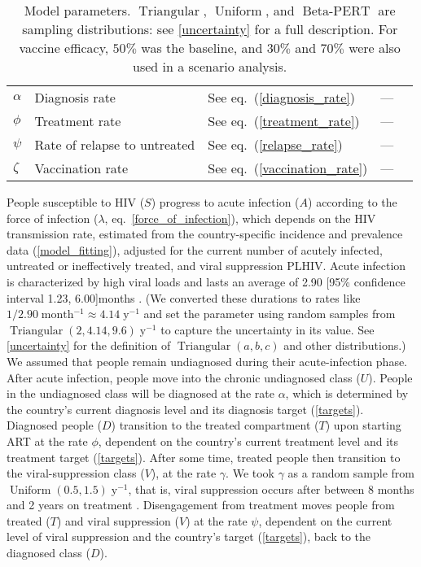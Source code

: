 \documentclass{article}
\DeclareMathOperator{\Uniform}{Uniform}
\DeclareMathOperator{\Triangular}{Triangular}
\DeclareMathOperator{\BetaPERT}{Beta-PERT}
\begin{document}
\begin{table}
\begin{center}
\begin{tabularx}{\textwidth}{lXlll}
      $\alpha$ & Diagnosis rate & See eq.~(\ref{diagnosis_rate}) & --- \\
      $\phi$ & Treatment rate & See eq.~(\ref{treatment_rate}) & --- \\
      $\psi$ & Rate of relapse to untreated & See eq.~(\ref{relapse_rate})
      & --- \\
      $\zeta$ & Vaccination rate & See eq.~(\ref{vaccination_rate}) & --- \\
      \hline
    \end{tabularx}
    \caption{Model parameters. $\Triangular$, $\Uniform$, and
      $\BetaPERT$ are sampling distributions: see
      \autoref{uncertainty} for a full description.  For vaccine
      efficacy, $50\%$ was the baseline, and $30\%$ and $70\%$ were
      also used in a scenario analysis.}
    \label{model_param}
  \end{center}
\end{table}

People susceptible to HIV ($S$) progress to acute infection ($A$)
according to the force of infection ($\lambda$,
eq.~\eqref{force_of_infection}), which depends on the HIV transmission
rate, estimated from the country-specific incidence and prevalence
data (\autoref{model_fitting}), adjusted for the current number of
acutely infected, untreated or ineffectively treated, and viral
suppression PLHIV.  Acute infection is characterized by high viral
loads and lasts an average of 2.90 [95\% confidence interval 1.23,
6.00]\;months \cite{Hollingsworth2008-iy}.  (We converted these
durations to rates like $1 / 2.90\;\text{month$^{-1}$} \approx
4.14\;\text{y$^{-1}$}$ and set the parameter using random samples from
$\Triangular(2, 4.14, 9.6)\;\text{y$^{-1}$}$ to capture the
uncertainty in its value.  See \autoref{uncertainty} for the
definition of $\Triangular(a, b, c)$ and other distributions.)  We
assumed that people remain undiagnosed during their acute-infection
phase. After acute infection, people move into the chronic undiagnosed
class ($U$).  People in the undiagnosed class will be diagnosed at the
rate $\alpha$, which is determined by the country's current diagnosis
level and its diagnosis target (\autoref{targets}).  Diagnosed people
($D$) transition to the treated compartment ($T$) upon starting ART at
the rate $\phi$, dependent on the country's current treatment level
and its treatment target (\autoref{targets}).  After some time,
treated people then transition to the viral-suppression class ($V$),
at the rate $\gamma$.  We took $\gamma$ as a random sample from
$\Uniform(0.5, 1.5)\;\text{y$^{-1}$}$, that is, viral suppression
occurs after between 8 months and 2 years on treatment
\cite{Currie2009-yz}.  Disengagement from treatment moves people from
treated ($T$) and viral suppression ($V$) at the rate $\psi$,
dependent on the current level of viral suppression and the country's
target (\autoref{targets}), back to the diagnosed class ($D$).
\end{document}
